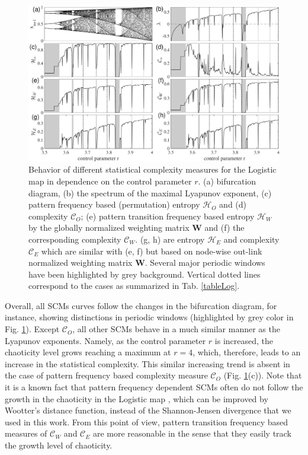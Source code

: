 \documentclass[12pt,aip,cha,reprint,nofootinbib]{revtex4-1}
\begin{document}
\begin{figure}
	\centering 
	\includegraphics[width=2\columnwidth]{logisticEntropy.pdf}
\caption{\small{Behavior of different statistical complexity measures for the Logistic map in dependence on the control parameter $r$. (a) bifurcation diagram, (b) the spectrum of the maximal Lyapunov exponent, (c) pattern frequency based (permutation) entropy $\mathcal{H}_O$ and (d) complexity $\mathcal{C}_O$; (e) pattern transition frequency based entropy $\mathcal{H}_W$ by the globally normalized weighting matrix $\mathbf{W}$ and (f) the corresponding complexity $\mathcal{C}_W$. (g, h) are entropy $\mathcal{H}_E$ and complexity $\mathcal{C}_E$ which are similar with (e, f) but based on node-wise out-link normalized weighting matrix $\mathbf{W}$. Several major periodic windows have been highlighted by grey background. Vertical dotted lines correspond to the cases as summarized in Tab. \ref{tableLog}. } \label{fig:bifurcation}}
\end{figure}

Overall, all SCMs curves follow the changes in the bifurcation diagram, for instance, showing distinctions in periodic windows  (highlighted by grey color in Fig. \ref{fig:bifurcation}). Except $\mathcal{C}_O$, all other SCMs behave in a much similar manner as the Lyapunov exponents. Namely, as the control parameter $r$ is increased, the chaoticity level grows reaching a maximum at $r = 4$, which, therefore, leads to an increase in the statistical complexity. This similar increasing trend is absent in the case of pattern frequency based complexity measure $\mathcal{C}_O$ (Fig. \ref{fig:bifurcation}(c)). Note that it is a known fact that pattern frequency dependent SCMs often do not follow the growth in the chaoticity in the Logistic map \cite{MartinPLA2003}, which can be improved by Wootter's distance function, instead of the Shannon-Jensen divergence that we used in this work. From this point of view, pattern transition frequency based measures of $\mathcal{C}_W$ and $\mathcal{C}_E$ are more reasonable in the sense that they easily track the growth level of chaoticity. 
\end{document}
